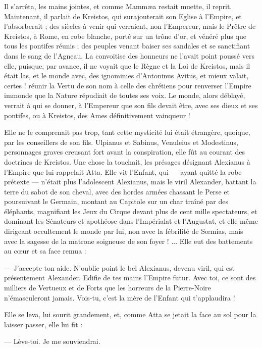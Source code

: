\documentclass[a4paper, 11pt, oneside, polutonikogreek, french]{article}
\begin{document}
Il s'arrêta, les mains jointes, et comme Mammæa restait muette, il reprit. Maintenant, il parlait de Kreistos, qui surajouterait son Eglise à l'Empire, et l'absorberait ; des siècles à venir qui verraient, non l'Empereur, mais le Prêtre de Kreistos, à Rome, en robe blanche, porté sur un trône d'or, et vénéré plus que tous les pontifes réunis ; des peuples venant baiser ses sandales et se sanctifiant dans le sang de l'Agneau. La convoitise des honneurs ne l'avait point poussé vers elle, puisque, par avance, il ne voyait que le Règne et la Loi de Kreistos, mais il était las, et le monde avec, des ignominies d'Antoninus Avitus, et mieux valait, certes ! réunir la Vertu de son nom à celle des chrétiens pour renverser l'Empire immonde que la Nature répudiait de toutes ses voix. Le monde, alors déblayé, verrait à qui se donner, à l'Empereur que son fils devait être, avec ses dieux et ses pontifes, ou à Kreistos, des Ames définitivement vainqueur !

Elle ne le comprenait pas trop, tant cette mysticité lui était étrangère, quoique, par les conseillers de son fils. Ulpianus et Sabinus, Venuleius et Modestinus, personnages graves creusant fort avant la conspiration, elle fût au courant des doctrines de Kreistos. Une chose la touchait, les présages désignant Alexianus à l'Empire que lui rappelait Atta. Elle vit l'Enfant, qui --- ayant quitté la robe prétexte --- n'était plus l'adolescent Alexianus, mais le viril Alexander, battant la terre du sabot de son cheval, avec des hordes armées chassant le Perse et poursuivant le Germain, montant au Capitole sur un char traîné par des éléphants, magnifiant les Jeux du Cirque devant plus de cent mille spectateurs, et dominant les Sénateurs et apothéose dans l’Impérialat et l'Augustat, et elle-même dirigeant occultement le monde par lui, non avec la fébrilité de Sœmias, mais avec la sagesse de la matrone soigneuse de son foyer ! ... Elle eut des battements au cœur et sa face remua :

--- J'accepte ton aide. N'oublie point le bel Alexianus, devenu viril, qui est présentement Alexander. Edifie de tes mains l'Empire futur. Avec toi, ce sont des milliers de Vertueux et de Forts que les horreurs de la Pierre-Noire n'émasculeront jamais. Vois-tu, c'est la mère de l'Enfant qui t'applaudira !

Elle se leva, lui sourit grandement, et, comme Atta se jetait la face au sol pour la laisser passer, elle lui fit :

--- Lève-toi. Je me souviendrai.
\end{document}

